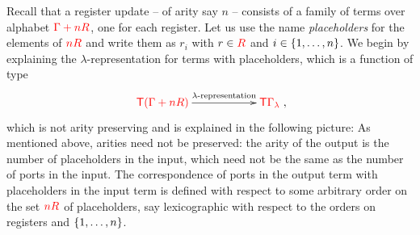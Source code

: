 Recall that a register update -- of arity say $n$ -- consists of a family of terms  over alphabet ${\color{red}{\Gamma + n{{\color{red}{R}}}}}$, one for each register. Let us use the name \emph{placeholders} for the elements of ${\color{red}{n {{\color{red}{R}}}}}$ and write them as $r_i$ with $r \in {{\color{red}{R}}}$ and  $i \in \{1,\ldots,n\}$.
We begin by explaining the $\lambda$-representation for   terms with  placeholders, which is a function of type
\begin{align}\label{eq:placeholders}
\xymatrix@C=2cm{
    \ranked{\tmonad(\rGamma+n R)} \ar[r]^-{\text{$\lambda$-representation}} &
    \ranked{\tmonad {\Gamma_\lambda}}
},
\end{align}
which is not arity preserving and is  explained in the following picture:
As mentioned above, 
 arities need not be preserved: the arity of the output is the number of placeholders in the input, which need not be the same as the number of ports in the input. The correspondence of ports in the output term with placeholders in the input term is defined with respect to some arbitrary order on the set ${\color{red}{n {{\color{red}{R}}}}}$ of placeholders, say lexicographic with respect to the orders on registers and  $\{1,\ldots,n\}$.


